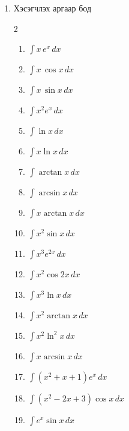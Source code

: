 \begin{enumerate}
\begin{enumerate}
\begin{multicols}{2}
\end{multicols}
\end{enumerate}
\item Хэсэгчлэх аргаар бод  
\begin{multicols}{2}
\begin{enumerate}
 
\item $\displaystyle\int x\,e^x\,dx$
 
\item $\displaystyle\int x\,\cos x\,dx$
 
\item $\displaystyle\int x\,\sin x\,dx$
 
\item $\displaystyle\int x^2 e^x\,dx$
 
\item $\displaystyle\int \ln x\,dx$
 
\item $\displaystyle\int x\ln x\,dx$
 
\item $\displaystyle\int \arctan x\,dx$
 
\item $\displaystyle\int \arcsin x\,dx$
 
\item $\displaystyle\int x\arctan x\,dx$
 
\item $\displaystyle\int x^2\sin x\,dx$
 
\item $\displaystyle\int x^3 e^{2x}\,dx$
 
\item $\displaystyle\int x^2\cos 2x\,dx$
 
\item $\displaystyle\int x^3\ln x\,dx$
 
\item $\displaystyle\int x^2\arctan x\,dx$
 
\item $\displaystyle\int x^2\ln^2 x\,dx$
 
\item $\displaystyle\int x\arcsin x\,dx$
 
\item $\displaystyle\int (x^2+x+1)e^x\,dx$
 
\item $\displaystyle\int (x^2-2x+3)\cos x\,dx$
 
\item $\displaystyle\int e^x\sin x\,dx$
 

\end{enumerate}
\end{multicols}
\end{enumerate}
